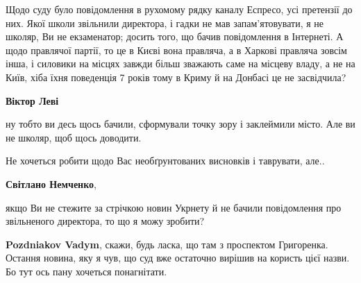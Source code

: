 \begin{itemize}
\begin{itemize}
 

Щодо суду було повідомлення в рухомому рядку каналу Еспресо, усі претензії до
них. Якої школи звільнили директора, і гадки не мав запам'ятовувати, я не
школяр, Ви не екзаменатор; досить того, що бачив повідомлення в Інтернеті. А
щодо правлячої партії, то це в Києві вона правляча, а в Харкові правляча зовсім
інша, і силовики на місцях завжди більш зважають саме на місцеву владу, а не на
Київ, хіба їхня поведенція 7 років тому в Криму й на Донбасі це не засвідчила?

 
\textbf{Віктор Леві} 

ну тобто ви десь щось бачили, сформували точку зору і заклеймили місто. Але ви
не школяр, щоб щось доводити.

Не хочеться робити щодо Вас необґрунтованих висновків і таврувати, але..


 
\textbf{Світлано Немченко}, 

якщо Ви не стежите за стрічкою новин Укрнету й не бачили повідомлення про
звільненого директора, то що я можу зробити?


 
\textbf{Pozdniakov Vadym}, скажи, будь ласка, що там з проспектом Григоренка.
Остання новина, яку я чув, що суд вже остаточно вирішив на користь цієї назви.
Бо тут ось пану хочеться понагнітати.

 

\end{itemize}
\end{itemize}
